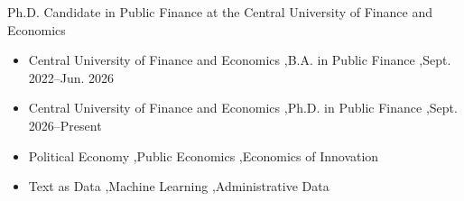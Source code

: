 \documentclass[a4paper,10pt]{article}
\begin{document}

\begin{center}
  \small Ph.D. Candidate in Public Finance at the Central University of Finance and Economics
\end{center}
\vspace{-0.5em}



\begin{itemize}
\item Central University of Finance and Economics \sep B.A. in Public Finance \sep Sept. 2022--Jun. 2026
\item Central University of Finance and Economics \sep Ph.D. in Public Finance \sep Sept. 2026--Present
\end{itemize}


\begin{itemize}
\item {} Political Economy \sep Public Economics \sep Economics of Innovation
\item {} Text as Data \sep Machine Learning \sep Administrative Data
\end{itemize}

\end{document}
